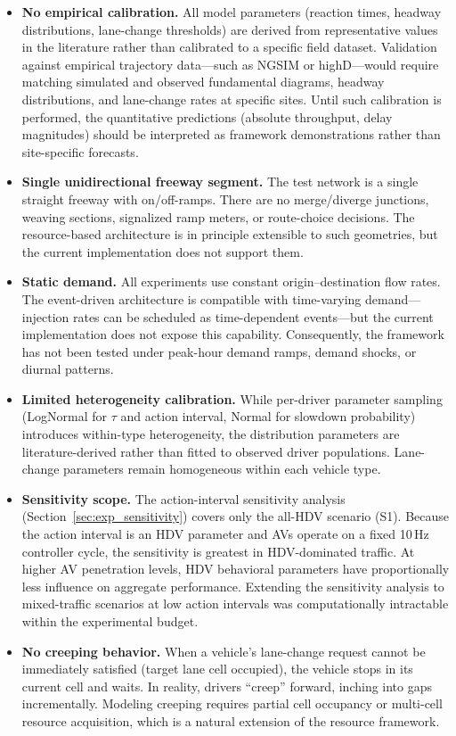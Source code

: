 \documentclass[review,authoryear]{elsarticle}
\begin{document}
\begin{itemize}
    \item \textbf{No empirical calibration.} All model parameters (reaction times, headway distributions, lane-change thresholds) are derived from representative values in the literature rather than calibrated to a specific field dataset. Validation against empirical trajectory data---such as NGSIM or highD---would require matching simulated and observed fundamental diagrams, headway distributions, and lane-change rates at specific sites. Until such calibration is performed, the quantitative predictions (absolute throughput, delay magnitudes) should be interpreted as framework demonstrations rather than site-specific forecasts.

    \item \textbf{Single unidirectional freeway segment.} The test network is a single straight freeway with on/off-ramps. There are no merge/diverge junctions, weaving sections, signalized ramp meters, or route-choice decisions. The resource-based architecture is in principle extensible to such geometries, but the current implementation does not support them.

    \item \textbf{Static demand.} All experiments use constant origin--destination flow rates. The event-driven architecture is compatible with time-varying demand---injection rates can be scheduled as time-dependent events---but the current implementation does not expose this capability. Consequently, the framework has not been tested under peak-hour demand ramps, demand shocks, or diurnal patterns.

    \item \textbf{Limited heterogeneity calibration.} While per-driver parameter sampling (LogNormal for $\tau$ and action interval, Normal for slowdown probability) introduces within-type heterogeneity, the distribution parameters are literature-derived rather than fitted to observed driver populations. Lane-change parameters remain homogeneous within each vehicle type.

    \item \textbf{Sensitivity scope.} The action-interval sensitivity analysis (Section~\ref{sec:exp_sensitivity}) covers only the all-HDV scenario (S1). Because the action interval is an HDV parameter and AVs operate on a fixed 10\,Hz controller cycle, the sensitivity is greatest in HDV-dominated traffic. At higher AV penetration levels, HDV behavioral parameters have proportionally less influence on aggregate performance. Extending the sensitivity analysis to mixed-traffic scenarios at low action intervals was computationally intractable within the experimental budget.

    \item \textbf{No creeping behavior.} When a vehicle's lane-change request cannot be immediately satisfied (target lane cell occupied), the vehicle stops in its current cell and waits. In reality, drivers ``creep'' forward, inching into gaps incrementally. Modeling creeping requires partial cell occupancy or multi-cell resource acquisition, which is a natural extension of the resource framework.
\end{itemize}
\end{document}
